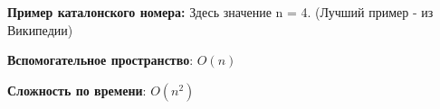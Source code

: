 \vspace{\baselineskip}
\textbf{Пример каталонского номера:}
\vspace{\baselineskip}
Здесь значение n = 4. (Лучший пример - из Википедии)

\vspace{\baselineskip}

\vspace{\baselineskip}

\textbf{Вспомогательное пространство}: $O(n)$

\textbf{Сложность по времени}: $O(n^2)$

